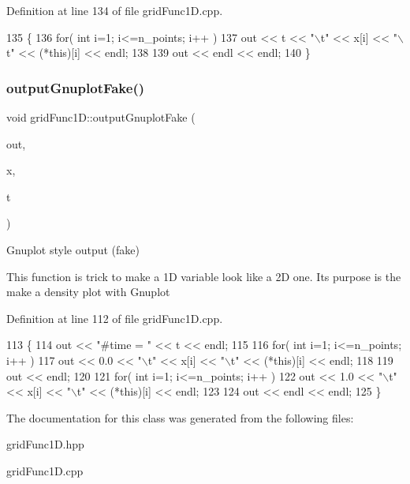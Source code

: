 Definition at line 134 of file grid\+Func1\+D.\+cpp.


\begin{DoxyCode}
135 \{
136   \textcolor{keywordflow}{for}( \textcolor{keywordtype}{int} i=1; i<=n\_points; i++ )
137     out << t << \textcolor{stringliteral}{"\(\backslash\)t"} << x[i] << \textcolor{stringliteral}{"\(\backslash\)t"} << (*\textcolor{keyword}{this})[i] << endl;
138 
139   out << endl << endl;
140 \}
\end{DoxyCode}
\mbox{\label{classgridFunc1D_a5dc63c77c8be317834291dcd0d66079d}} 
\subsubsection{\texorpdfstring{output\+Gnuplot\+Fake()}{outputGnuplotFake()}}
{\footnotesize\ttfamily void grid\+Func1\+D\+::output\+Gnuplot\+Fake (\begin{DoxyParamCaption}\item[{ofstream \&}]{out,  }\item[{\hyperlink{classgridFunc1D}{grid\+Func1D} \&}]{x,  }\item[{const double}]{t }\end{DoxyParamCaption})}



Gnuplot style output (fake) 

This function is trick to make a 1D variable look like a 2D one. Its purpose is the make a density plot with Gnuplot 

Definition at line 112 of file grid\+Func1\+D.\+cpp.


\begin{DoxyCode}
113 \{
114   out << \textcolor{stringliteral}{"#time = "} << t << endl;
115 
116   \textcolor{keywordflow}{for}( \textcolor{keywordtype}{int} i=1; i<=n\_points; i++ )
117     out << 0.0 << \textcolor{stringliteral}{"\(\backslash\)t"} << x[i] << \textcolor{stringliteral}{"\(\backslash\)t"} << (*\textcolor{keyword}{this})[i] << endl;
118 
119   out << endl;
120 
121   \textcolor{keywordflow}{for}( \textcolor{keywordtype}{int} i=1; i<=n\_points; i++ )
122     out << 1.0 << \textcolor{stringliteral}{"\(\backslash\)t"} << x[i] << \textcolor{stringliteral}{"\(\backslash\)t"} << (*\textcolor{keyword}{this})[i] << endl;
123 
124   out << endl << endl;
125 \}
\end{DoxyCode}


The documentation for this class was generated from the following files\+:\begin{DoxyCompactItemize}
\item 
grid\+Func1\+D.\+hpp\item 
grid\+Func1\+D.\+cpp\end{DoxyCompactItemize}
